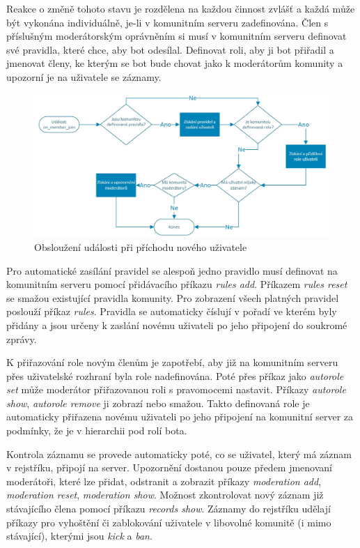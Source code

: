 \documentclass[
  program=inf,
biblatex=false,
sourcecodes=true,
joinlists=true,
  figures=true,
  tables=true,
  glossaries=true,
  index=false
]{kidiplom}
\begin{document}
Reakce o změně tohoto stavu je rozdělena na každou činnost zvlášť a každá může být
vykonána individuálně, je-li v komunitním serveru zadefinována. Člen s příslušným
moderátorským oprávněním si musí v komunitním serveru definovat své pravidla, které chce, aby bot odesílal.
Definovat roli, aby ji bot přiřadil a jmenovat členy, ke kterým se bot bude chovat jako k
moderátorům komunity a upozorní je na uživatele se záznamy.

\begin{figure}[h]
  \centering \includegraphics[scale=0.7]{on_member_join}
  \caption{\label{memberjoin}Obsloužení události při příchodu nového uživatele}
\end{figure}

Pro automatické zasílání pravidel se alespoň jedno pravidlo musí definovat na komunitním serveru
pomocí přidávacího příkazu {\it rules add}. Příkazem {\it rules reset} se smažou existující pravidla
komunity. Pro zobrazení všech platných pravidel poslouží příkaz {\it rules}. Pravidla se automaticky číslují
v pořadí ve kterém byly přidány a jsou určeny k zaslání novému uživateli po jeho připojení do soukromé zprávy.

K přiřazování role novým členům je zapotřebí, aby již na komunitním serveru přes uživatelské rozhraní
byla role nadefinována. Poté přes příkaz jako {\it autorole set} může moderátor přiřazovanou roli 
s pravomocemi nastavit.
Příkazy {\it autorole show}, {\it autorole remove} ji zobrazí nebo smažou. Takto definovaná role je 
automaticky přiřazena novému uživateli po jeho připojení na komunitní server za podmínky, že je v hierarchii 
pod rolí bota.

Kontrola záznamu se provede automaticky poté, co se uživatel, který má záznam v rejstříku, připojí na server. 
Upozornění dostanou pouze předem jmenovaní moderátoři, které lze přidat, odstranit a zobrazit příkazy 
{\it moderation add}, {\it moderation reset}, {\it moderation show}. Možnost zkontrolovat nový záznam
již stávajícího člena pomocí příkazu {\it records show}. Záznamy do rejstříku
udělají příkazy pro vyhoštění či zablokování uživatele v libovolné komunitě (i mimo stávající), kterými
jsou {\it kick} a {\it ban}.
\end{document}
